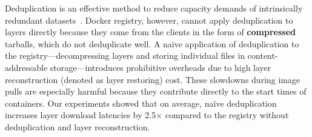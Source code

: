 
Deduplication is an effective method to reduce capacity demands of intrinsically redundant
datasets~\cite{paulo2014survey}.
%
%
%
Docker registry, however, cannot apply deduplication to layers directly 
because they come from the clients in the form of \textbf{compressed} tarballs,
which do not deduplicate well.
%
%
%
A na\"{i}ve application of deduplication to the registry---decompressing
layers and storing individual files in content-addressable storage---introduces
prohibitive overheads due to high layer reconstruction 
(denoted as layer restoring) cost.
%
These slowdowns during image pulls are especially
harmful because they contribute directly to the start times of containers.
%
Our experiments showed that on average, na\"{i}ve deduplication increases layer
download latencies by 2.5$\times$ compared to the registry without deduplication and layer reconstruction.

